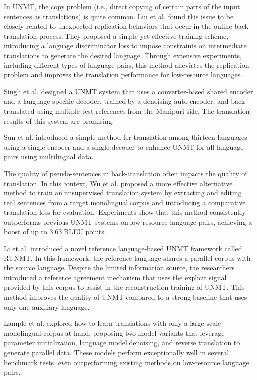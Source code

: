 \documentclass[acmsmall]{acmart}
\begin{document}
In UNMT, the copy problem (i.e., direct copying of certain parts of the input sentences as translations) is quite common. Liu et al. \cite{n4-71} found this issue to be closely related to unexpected replication behaviors that occur in the online back-translation process. They proposed a simple yet effective training scheme, introducing a language discriminator loss to impose constraints on intermediate translations to generate the desired language. Through extensive experiments, including different types of language pairs, this method alleviates the replication problem and improves the translation performance for low-resource languages. 

Singh et al. \cite{n4-72} designed a UNMT system that uses a converter-based shared encoder and a language-specific decoder, trained by a denoising auto-encoder, and back-translated using multiple test references from the Manipuri side. The translation results of this system are promising. 

Sun et al. \cite{n4-73} introduced a simple method for translation among thirteen languages using a single encoder and a single decoder to enhance UNMT for all language pairs using multilingual data. 

The quality of pseudo-sentences in back-translation often impacts the quality of translation. In this context, Wu et al. \cite{n4-74} proposed a more effective alternative method to train an unsupervised translation system by extracting and editing real sentences from a target monolingual corpus and introducing a comparative translation loss for evaluation. Experiments show that this method consistently outperforms previous UNMT systems on low-resource language pairs, achieving a boost of up to 3.63 BLEU points.

Li et al. \cite{n4-75} introduced a novel reference language-based UNMT framework called RUNMT. In this framework, the reference language shares a parallel corpus with the source language. Despite the limited information source, the researchers introduced a reference agreement mechanism that uses the explicit signal provided by this corpus to assist in the reconstruction training of UNMT. This method improves the quality of UNMT compared to a strong baseline that uses only one auxiliary language.

Lample et al. \cite{n4-a1} explored how to learn translations with only a large-scale monolingual corpus at hand, proposing two model variants that leverage parameter initialization, language model denoising, and reverse translation to generate parallel data. These models perform exceptionally well in several benchmark tests, even outperforming existing methods on low-resource language pairs.
\end{document}
